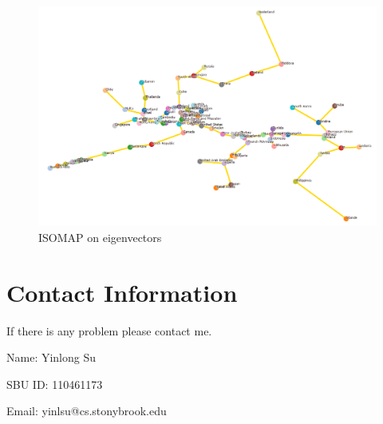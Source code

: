 \documentclass[11pt]{article}
\begin{document}
\begin{figure}[!htp]
\centering
\includegraphics[width=\textwidth]{../vis/country.eigens.vis.isomap.png}
\caption{ISOMAP on eigenvectors}
\label{fig:isomapEigenvectorsFigure}
\end{figure}

\section{Contact Information}
If there is any problem please contact me.
\par
Name: Yinlong Su
\par
SBU ID: 110461173
\par
Email: yinlsu@cs.stonybrook.edu
\end{document}
